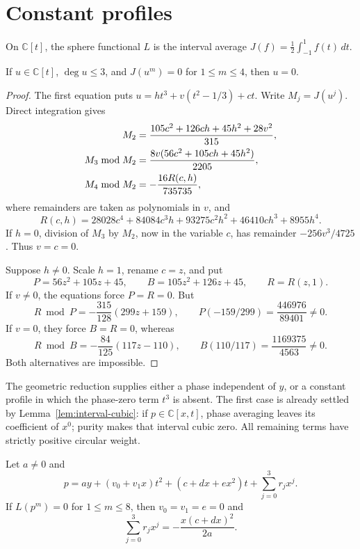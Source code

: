 \section{Constant profiles}
\label{sec:constant-profiles}

On \(\mathbb C[t]\), the sphere functional \(L\) is the interval average
\(J(f)=\frac12\int_{-1}^1 f(t)\,dt\).

\begin{lemma}
\label{lem:interval-cubic}
If \(u\in\mathbb C[t]\), \(\deg u\le3\), and
\(J(u^m)=0\) for \(1\le m\le4\), then \(u=0\).
\end{lemma}

\begin{proof}
The first equation puts
\(u=h t^3+v(t^2-1/3)+ct\). Write \(M_j=J(u^j)\). Direct integration gives
\begin{align}
 M_2&=\frac{105c^2+126ch+45h^2+28v^2}{315},\notag\\
 M_3\bmod M_2&=\frac{8v(56c^2+105ch+45h^2)}{2205},\notag\\
 M_4\bmod M_2&=-\frac{16R(c,h)}{735735},
 \label{eq:interval-cubic-remainders}
\end{align}
where remainders are taken as polynomials in \(v\), and
\[
 R(c,h)=28028c^4+84084c^3h+93275c^2h^2+46410ch^3+8955h^4.
\]
If \(h=0\), division of \(M_3\) by \(M_2\), now in the variable
\(c\), has remainder \(-256v^3/4725\). Thus \(v=c=0\).

Suppose \(h\ne0\). Scale \(h=1\), rename \(c=z\), and put
\[
 P=56z^2+105z+45,\qquad B=105z^2+126z+45,\qquad R=R(z,1).
\]
If \(v\ne0\), the equations force \(P=R=0\). But
\[
 R\bmod P=-\frac{315}{128}(299z+159),\qquad
 P(-159/299)=\frac{446976}{89401}\ne0.
\]
If \(v=0\), they force \(B=R=0\), whereas
\[
 R\bmod B=-\frac{84}{125}(117z-110),\qquad
 B(110/117)=\frac{1169375}{4563}\ne0.
\]
Both alternatives are impossible.
\end{proof}

The geometric reduction supplies either a phase independent of \(y\),
or a constant profile in which the phase-zero term \(t^3\) is absent.
The first case is already settled by Lemma~\ref{lem:interval-cubic}:
if \(p\in\mathbb C[x,t]\), phase averaging leaves its coefficient of
\(x^0\); purity makes that interval cubic zero. All remaining terms
have strictly positive circular weight.

\begin{proposition}
\label{prop:finite-constant-profile}
Let \(a\ne0\) and
\begin{equation}
 p=ay+(v_0+v_1x)t^2+(c+dx+ex^2)t+\sum_{j=0}^3r_jx^j.
 \label{eq:constant-profile-family}
\end{equation}
If \(L(p^m)=0\) for \(1\le m\le8\), then \(v_0=v_1=e=0\) and
\begin{equation}
 \sum_{j=0}^3r_jx^j=-\frac{x(c+dx)^2}{2a}.
 \label{eq:constant-profile-shear}
\end{equation}
\end{proposition}


